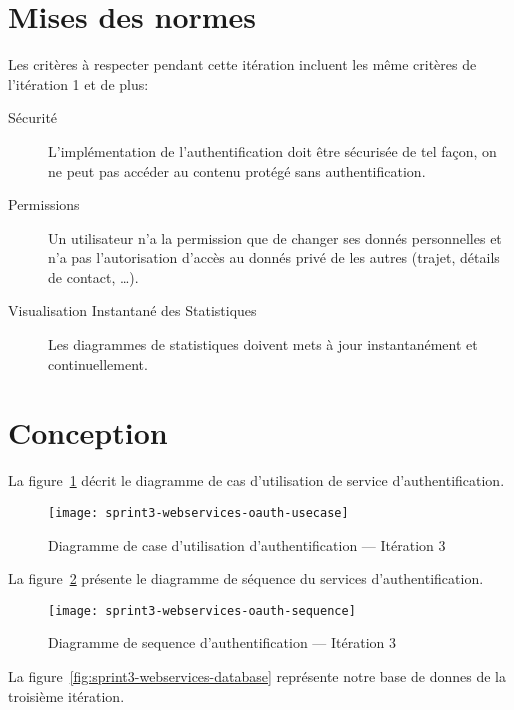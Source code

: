 \section{Mises des normes}

Les critères à respecter pendant cette itération incluent les même critères de
l'itération 1 et de plus:

\begin{description}
    \item [Sécurité] L'implémentation de l'authentification doit être sécurisée
        de tel façon, on ne peut pas accéder au contenu protégé sans
        authentification.
    \item [Permissions] Un utilisateur n'a la permission que de changer ses
        donnés personnelles et n'a pas l'autorisation d'accès au donnés privé
        de les autres (trajet, détails de contact, \ldots).
    \item [Visualisation Instantané des Statistiques] Les diagrammes de
        statistiques doivent mets à jour instantanément et continuellement.
\end{description}

\section{Conception}

La figure~\ref{fig:sprint3-webservices-oauth-usecase} décrit le diagramme
de cas d'utilisation de service d'authentification.

\begin{figure}[htbp]
    \centering
    \texttt{[image: sprint3-webservices-oauth-usecase]}
    \caption{Diagramme de case d'utilisation d'authentification --- Itération 3}
\label{fig:sprint3-webservices-oauth-usecase}
\end{figure}

La figure~\ref{fig:sprint3-webservices-oauth-sequence} présente le diagramme de
séquence du services d'authentification.

\begin{figure}[htbp]
    \centering
    \texttt{[image: sprint3-webservices-oauth-sequence]}
    \caption{Diagramme de sequence d'authentification --- Itération 3}
\label{fig:sprint3-webservices-oauth-sequence}
\end{figure}

La figure~\ref{fig:sprint3-webservices-database} représente notre base de
donnes de la troisième itération.

